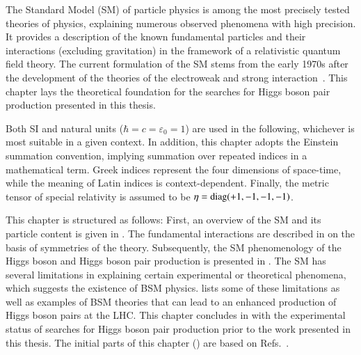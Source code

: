 The Standard Model (SM) of particle physics is among the most precisely tested
theories of physics, explaining numerous observed phenomena with high
precision. It provides a description of the known fundamental particles and
their interactions (excluding gravitation) in the framework of a relativistic
quantum field theory. The current formulation of the SM stems from the early
1970s after the development of the theories of the electroweak and strong
interaction~\cite{Glashow:1961tr,Salam:1964ry,Weinberg:1967tq,Englert:1964et,Higgs:1964pj,tHooft:1971qjg,Fritzsch:1973pi,Gross:1973id,Politzer:1973fx}.
This chapter lays the theoretical foundation for the searches for Higgs boson
pair production presented in this thesis.

Both SI and natural units ($\hbar = c = \varepsilon_0 = 1$) are used in the
following, whichever is most suitable in a given context. In addition, this
chapter adopts the Einstein summation convention, implying summation over
repeated indices in a mathematical term. Greek indices represent the four
dimensions of space-time, while the meaning of Latin indices is
context-dependent. Finally, the metric tensor of special relativity is assumed
to be $\eta = \operatorname{diag}(+1, -1, -1, -1)$.

This chapter is structured as follows: First, an overview of the SM and its
particle content is given in . The fundamental
interactions are described in  on the
basis of symmetries of the theory. Subsequently, the SM phenomenology of the
Higgs boson and Higgs boson pair production is presented in
. The SM has several limitations in explaining certain
experimental or theoretical phenomena, which suggests the existence of BSM
physics.  lists some of these limitations as well as examples of
BSM theories that can lead to an enhanced production of Higgs boson pairs at the
LHC. This chapter concludes in  with the
experimental status of searches for Higgs boson pair production prior to the
work presented in this thesis. The initial parts of this chapter
() are based on
Refs.~\cite{Halzen:1984mc,Thomson:2013zua,Djouadi:2005gi}.

